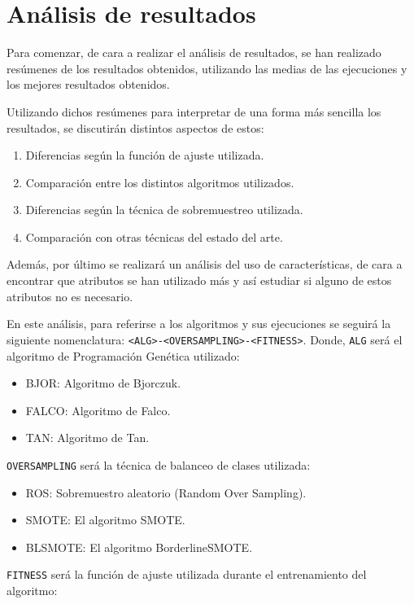 \section{Análisis de resultados}

Para comenzar, de cara a realizar el análisis de resultados, se han realizado resúmenes de los resultados obtenidos, utilizando las medias de las ejecuciones y los mejores resultados obtenidos.

Utilizando dichos resúmenes para interpretar de una forma más sencilla los resultados, se discutirán distintos aspectos de estos:

\begin{enumerate}
	\item Diferencias según la función de ajuste utilizada.
	\item Comparación entre los distintos algoritmos utilizados.
	\item Diferencias según la técnica de sobremuestreo utilizada.
	\item Comparación con otras técnicas del estado del arte.
\end{enumerate}

Además, por último se realizará un análisis del uso de características, de cara a encontrar que atributos se han utilizado más y así estudiar si alguno de estos atributos no es necesario.

En este análisis, para referirse a los algoritmos y sus ejecuciones se seguirá la siguiente nomenclatura: \texttt{<ALG>-<OVERSAMPLING>-<FITNESS>}. Donde, \texttt{ALG} será el algoritmo de Programación Genética utilizado:

\begin{itemize}
	\item BJOR: Algoritmo de Bjorczuk.
	\item FALCO: Algoritmo de Falco.
	\item TAN: Algoritmo de Tan.
\end{itemize}

\texttt{OVERSAMPLING} será la técnica de balanceo de clases utilizada:

\begin{itemize}
	\item ROS: Sobremuestro aleatorio (Random Over Sampling).
	\item SMOTE: El algoritmo SMOTE.
	\item BLSMOTE: El algoritmo BorderlineSMOTE.
\end{itemize}

\texttt{FITNESS} será la función de ajuste utilizada durante el entrenamiento del algoritmo:

